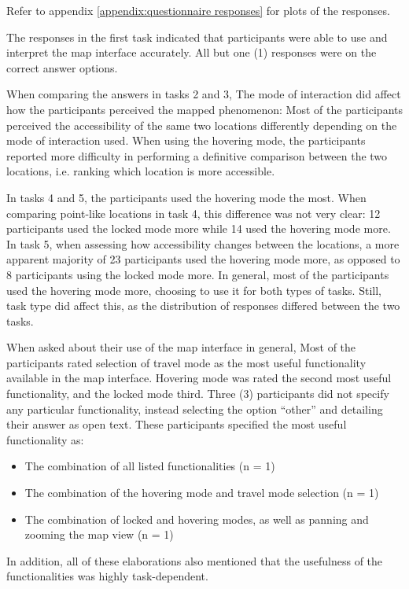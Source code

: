 Refer to appendix \ref{appendix:questionnaire responses} for plots of the responses.

The responses in the first task indicated that participants were
able to use and interpret the map interface accurately.
All but one (1) responses
were on the correct answer options.

When comparing the answers in tasks 2 and 3,
The mode of interaction did affect how the participants perceived the mapped phenomenon:
Most of the participants perceived
the accessibility of the same two locations
differently depending on the mode of interaction used.
When using the hovering mode, the participants reported more difficulty in
performing a definitive comparison between the two locations,
i.e. ranking which location is more accessible.

In tasks 4 and 5,
the participants used the hovering mode the most.
When comparing point-like locations in task 4,
this difference was not very clear:
12 participants used the locked mode more while 14 used the hovering mode more.
In task 5, when assessing how accessibility changes between the locations,
a more apparent majority of 23 participants used the hovering mode more,
as opposed to 8 participants using the locked mode more.
In general,
most of the participants used the hovering mode more,
choosing to use it for both types of tasks.
Still,
task type did affect this,
as the distribution of responses differed between the two tasks.

When asked about their use of the map interface in general,
Most of the participants rated selection of travel mode as
the most useful functionality available in the map interface.
Hovering mode was rated the second most useful functionality,
and the locked mode third.
Three (3) participants did not specify any particular functionality,
instead selecting the option \enquote{other}
and detailing their answer as open text.
These participants specified the most useful functionality as:
\begin{itemize}
	\item The combination of all listed functionalities (n = 1)
	\item The combination of the hovering mode and travel mode selection (n = 1)
	\item The combination of locked and hovering modes, as well as panning and zooming the map view (n = 1)
\end{itemize}
In addition,
all of these elaborations also mentioned
that the usefulness of the functionalities was highly task-dependent.

